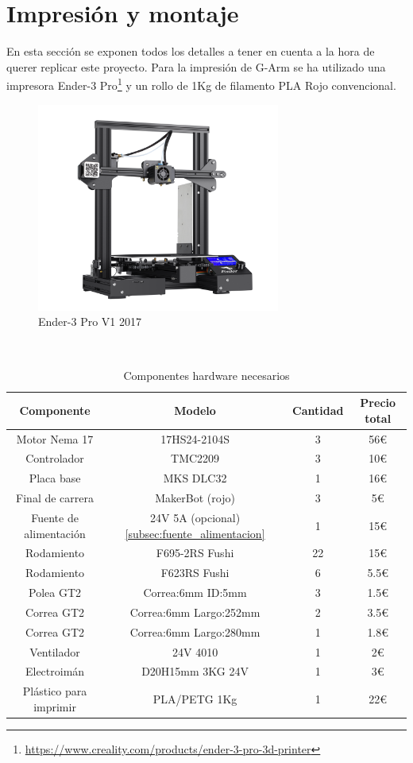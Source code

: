   
\section{Impresión y montaje}
En esta sección se exponen todos los detalles a tener en cuenta a la hora de querer replicar este proyecto. Para la impresión 
de G-Arm se ha utilizado una impresora Ender-3 Pro\footnote{\url{https://www.creality.com/products/ender-3-pro-3d-printer}} y un rollo 
de 1Kg de filamento PLA Rojo convencional.
\begin{figure} [h!]
\begin{center}
  \includegraphics[width=8cm]{figs/ender3.png}
\end{center}
\caption{Ender-3 Pro V1 2017}
\label{fig:ender3pro}
\end{figure}\   

\begin{table}[H]
\begin{center}
\begin{tabular}{|c|c|c|c|}
\hline
\textbf{Componente} & \textbf{Modelo} & \textbf{Cantidad} & \textbf{Precio total} \\
\hline
Motor Nema 17 & 17HS24-2104S & 3 & 56\euro \\
Controlador & TMC2209 & 3 & 10\euro \\
Placa base & MKS DLC32 & 1 & 16\euro \\
Final de carrera & MakerBot (rojo) & 3 & 5\euro \\
Fuente de alimentación & 24V 5A (opcional)\ref{subsec:fuente_alimentacion} & 1 & 15\euro \\
Rodamiento &  F695-2RS Fushi & 22 & 15\euro \\
Rodamiento & F623RS Fushi & 6 & 5.5\euro \\
Polea GT2 & Correa:6mm ID:5mm & 3 & 1.5\euro \\
Correa GT2 & Correa:6mm Largo:252mm & 2 & 3.5\euro \\ 
Correa GT2 &  Correa:6mm Largo:280mm & 1 & 1.8\euro \\ 
Ventilador & 24V 4010 & 1 & 2\euro \\
Electroimán & D20H15mm 3KG 24V & 1 & 3\euro \\
Plástico para imprimir & PLA/PETG 1Kg & 1 & 22\euro \\
\hline
\end{tabular}
\caption{Componentes hardware necesarios}
\label{cuadro:componentes}
\end{center}
\end{table}

